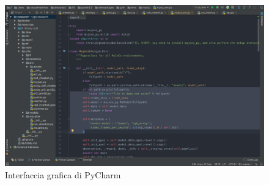 		\begin{figure}[H]
			\includegraphics[width=\textwidth]{img/pycharm.png}
			\caption{Interfaccia grafica di PyCharm}
		\end{figure}

